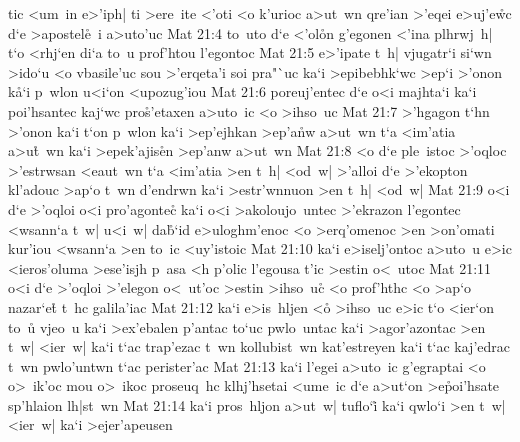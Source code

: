 tic
<um~in
e>'iph|
ti
>ere~ite
<'oti
<o
k'urioc
a>ut~wn
qre'ian
>'eqei
e>uj'e\r{w}c
d`e
>apostel\r{e}~i
a>uto'uc\bibvsend
\vs Mat 21:4
to~uto
d`e
<'ol\r{o}n
g'egonen
<'ina
plhrwj~h|
t`o
<rhj`en
di`a
to~u
prof'htou
l'egontoc\bibvsend
\vs Mat 21:5
e>'ipate
t~h|
vjugatr`i
si`wn
>ido`u
<o
vbasile'uc
sou
>'erqeta'i
soi
pra"`uc
ka`i
>epibebhk`wc
>ep`i
>'onon
k\r{a}`i
p~wlon
u<i`on
<upozug'iou\bibvsend
\vs Mat 21:6
poreuj'entec
d`e
o<i
majhta`i
ka`i
poi'hsantec
kaj`wc
pro\r{s}'etaxen
a>uto~ic
<o
>ihso~uc\bibvsend
\vs Mat 21:7
>'hgagon
t`hn
>'onon
ka`i
t`on
p~wlon
ka`i
>ep'ejhkan
>ep'a\r{n}w
a>ut~wn
t`a
<im'atia
a>u\r{t}~wn
ka`i
>epek'ajis\r{e}n
>ep'anw
a>ut~wn\bibvsend
\vs Mat 21:8
<o
d`e
ple~istoc
>'oqloc
>'estrwsan
<eaut~wn
t`a
<im'atia
>en
t~h|
<od~w|
>'alloi
d`e
>'ekopton
kl'adouc
>ap`o
t~wn
d'endrwn
ka`i
>estr'wnnuon
>en
t~h|
<od~w|\bibvsend
\vs Mat 21:9
o<i
d`e
>'oqloi
o<i
pro'agonte\r{c}
ka`i
o<i
>akoloujo~untec
>'ekrazon
l'egontec
<wsann`a
t~w|
u<i~w|
da\r{b}`id
e>uloghm'enoc
<o
>erq'omenoc
>en
>on'omati
kur'iou
<wsann`a
>en
to~ic
<uy'istoic\bibvsend
\vs Mat 21:10
ka`i
e>iselj'ontoc
a>uto~u
e>ic
<ieros'oluma
>ese'isjh
p~asa
<h
p'olic
l'egousa
t'ic
>estin
o<~utoc\bibvsend
\vs Mat 21:11
o<i
d`e
>'oqloi
>'elegon
o<~ut'oc
>estin
>ihso~uc\r{}
<o
prof'hthc
<o
>ap`o
nazar`e\r{t}
t~hc
galila'iac\bibvsend
\vs Mat 21:12
ka`i
e>is~hljen
<o\r{}
>ihso~uc
e>ic
t`o
<ier`on
to~u\r{}
vjeo~u
ka`i
>ex'ebalen
p'antac
to`uc
pwlo~untac
ka`i
>agor'azontac
>en
t~w|
<ier~w|
ka`i
t`ac
trap'ezac
t~wn
kollubist~wn
kat'estreyen
ka`i
t`ac
kaj'edrac
t~wn
pwlo'untwn
t`ac
perister'ac\bibvsend
\vs Mat 21:13
ka`i
l'egei
a>uto~ic
g'egraptai
<o
o>~ik'oc
mou
o>~ikoc
proseuq~hc
klhj'hsetai
<ume~ic
d`e
a>ut`on
>e\r{p}oi'hsate
sp'hlaion
lh|st~wn\bibvsend
\vs Mat 21:14
ka`i
pros~hljon
a>ut~w|
tuflo`i\r{}
ka`i
qwlo`i
>en
t~w|
<ier~w|
ka`i
>ejer'apeusen
